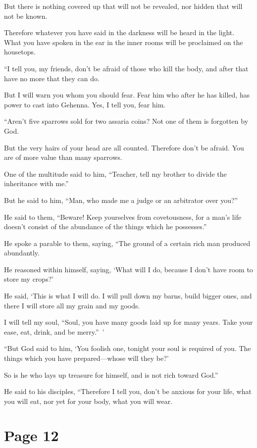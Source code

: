 But there is nothing covered up that will not be revealed, nor hidden that will not be known.

Therefore whatever you have said in the darkness will be heard in the light. What you have spoken in the ear in the inner rooms will be proclaimed on the housetops.

“I tell you, my friends, don’t be afraid of those who kill the body, and after that have no more that they can do.

But I will warn you whom you should fear. Fear him who after he has killed, has power to cast into Gehenna. Yes, I tell you, fear him.

“Aren’t five sparrows sold for two assaria coins? Not one of them is forgotten by God.

But the very hairs of your head are all counted. Therefore don’t be afraid. You are of more value than many sparrows.

One of the multitude said to him, “Teacher, tell my brother to divide the inheritance with me.”

But he said to him, “Man, who made me a judge or an arbitrator over you?”

He said to them, “Beware! Keep yourselves from covetousness, for a man’s life doesn’t consist of the abundance of the things which he possesses.”

He spoke a parable to them, saying, “The ground of a certain rich man produced abundantly.

He reasoned within himself, saying, ‘What will I do, because I don’t have room to store my crops?’

He said, ‘This is what I will do. I will pull down my barns, build bigger ones, and there I will store all my grain and my goods.

I will tell my soul, “Soul, you have many goods laid up for many years. Take your ease, eat, drink, and be merry.” ’

“But God said to him, ‘You foolish one, tonight your soul is required of you. The things which you have prepared—whose will they be?’

So is he who lays up treasure for himself, and is not rich toward God.”

He said to his disciples, “Therefore I tell you, don’t be anxious for your life, what you will eat, nor yet for your body, what you will wear.



\chapterornament
\section*{Page 12}

